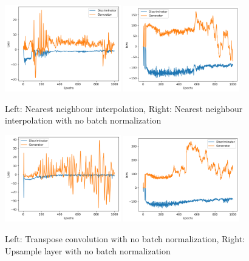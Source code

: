 \begin{figure}[t]
\centering
\includegraphics[width=0.45\textwidth]{loss_plots/wpgan_flute_hist_nearest_pitch_0729.png}
\includegraphics[width=0.45\textwidth]{loss_plots/wpgan_flute_hist_nearest_nonorm_pitch_0729.png}
\caption{Left: Nearest neighbour interpolation, Right: Nearest neighbour interpolation with no batch normalization}
\end{figure}

\begin{figure}[t]
\centering
\includegraphics[width=0.45\textwidth]{loss_plots/wpgan_flute_hist_nonorm_pitch_0729.png}
\includegraphics[width=0.45\textwidth]{loss_plots/wpgan_flute_hist_upsample_nonorm_pitch_0729.png}
\caption{Left: Transpose convolution with no batch normalization, Right: Upsample layer with no batch normalization}
\end{figure}


